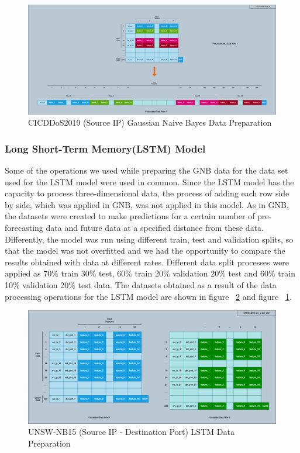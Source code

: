 \documentclass{article}
\begin{document}
\begin{figure}
  \centering
  \includegraphics[width=\textwidth]{cicddos2019_gnb.png}
  \caption{CICDDoS2019 (Source IP) Gaussian Naive Bayes Data Preparation}
  \label{cicddos2019-gnb}
\end{figure}

\subsubsection{Long Short-Term Memory(LSTM) Model}

Some of the operations we used while preparing the GNB data for the data set used for the LSTM model were used in common. Since the LSTM model has the capacity to process three-dimensional data, the process of adding each row side by side, which was applied in GNB, was not applied in this model. As in GNB, the datasets were created to make predictions for a certain number of pre-forecasting data and future data at a specified distance from these data. Differently, the model was run using different train, test and validation splits, so that the model was not overfitted and we had the opportunity to compare the results obtained with data at different rates. Different data split processes were applied as 70\% train 30\% test, 60\% train 20\% validation 20\% test and 60\% train 10\% validation 20\% test data. The datasets obtained as a result of the data processing operations for the LSTM model are shown in figure ~\ref{unswnb15-lstm} and figure ~\ref{cicddos2019-gnb}.

\begin{figure}
  \centering
  \includegraphics[width=\textwidth]{unswnb15_lstm.png}
  \caption{UNSW-NB15 (Source IP - Destination Port) LSTM Data Preparation}
  \label{unswnb15-lstm}
\end{figure}
\end{document}
